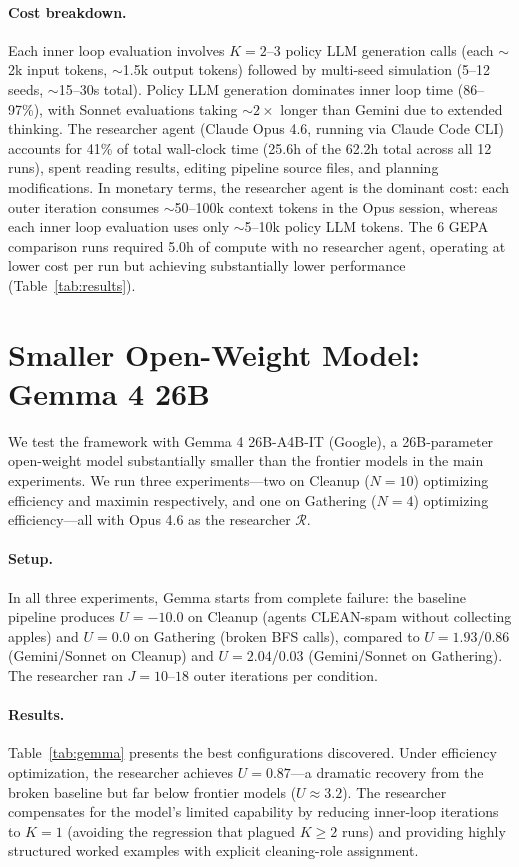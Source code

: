 \documentclass[sigconf,authordraft]{acmart}
\newcommand{\cR}{\mathcal{R}}
\begin{document}
\paragraph{Cost breakdown.}
Each inner loop evaluation involves $K{=}2$--$3$ policy LLM generation calls (each ${\sim}$2k input tokens, ${\sim}$1.5k output tokens) followed by multi-seed simulation (5--12 seeds, ${\sim}$15--30s total). Policy LLM generation dominates inner loop time (86--97\%), with Sonnet evaluations taking ${\sim}2{\times}$ longer than Gemini due to extended thinking. The researcher agent (Claude Opus 4.6, running via Claude Code CLI) accounts for 41\% of total wall-clock time (25.6h of the 62.2h total across all 12 runs), spent reading results, editing pipeline source files, and planning modifications. In monetary terms, the researcher agent is the dominant cost: each outer iteration consumes ${\sim}$50--100k context tokens in the Opus session, whereas each inner loop evaluation uses only ${\sim}$5--10k policy LLM tokens. The 6 GEPA comparison runs required 5.0h of compute with no researcher agent, operating at lower cost per run but achieving substantially lower performance (Table~\ref{tab:results}).

\section{Smaller Open-Weight Model: Gemma 4 26B}
\label{app:gemma}

We test the framework with Gemma 4 26B-A4B-IT (Google), a 26B-parameter open-weight model substantially smaller than the frontier models in the main experiments. We run three experiments---two on Cleanup ($N{=}10$) optimizing efficiency and maximin respectively, and one on Gathering ($N{=}4$) optimizing efficiency---all with Opus 4.6 as the researcher $\cR$.

\paragraph{Setup.} In all three experiments, Gemma starts from complete failure: the baseline pipeline produces $U{=}{-}10.0$ on Cleanup (agents CLEAN-spam without collecting apples) and $U{=}0.0$ on Gathering (broken BFS calls), compared to $U{=}1.93$/$0.86$ (Gemini/Sonnet on Cleanup) and $U{=}2.04$/$0.03$ (Gemini/Sonnet on Gathering). The researcher ran $J{=}10$--$18$ outer iterations per condition.

\paragraph{Results.} Table~\ref{tab:gemma} presents the best configurations discovered. Under efficiency optimization, the researcher achieves $U{=}0.87$---a dramatic recovery from the broken baseline but far below frontier models ($U{\approx}3.2$). The researcher compensates for the model's limited capability by reducing inner-loop iterations to $K{=}1$ (avoiding the regression that plagued $K{\geq}2$ runs) and providing highly structured worked examples with explicit cleaning-role assignment.
\end{document}
